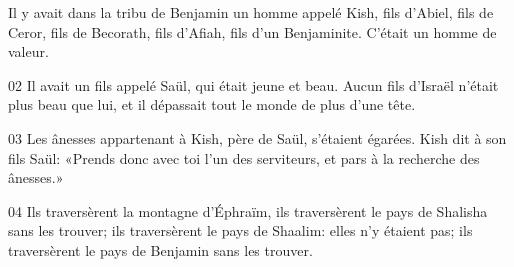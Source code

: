 Il y avait dans la tribu de Benjamin un homme appelé Kish, fils d’Abiel, fils de Ceror, fils de Becorath, fils d’Afiah, fils d’un Benjaminite. C’était un homme de valeur.

02 Il avait un fils appelé Saül, qui était jeune et beau. Aucun fils d’Israël n’était plus beau que lui, et il dépassait tout le monde de plus d’une tête.

03 Les ânesses appartenant à Kish, père de Saül, s’étaient égarées. Kish dit à son fils Saül: «Prends donc avec toi l’un des serviteurs, et pars à la recherche des ânesses.»

04 Ils traversèrent la montagne d’Éphraïm, ils traversèrent le pays de Shalisha sans les trouver; ils traversèrent le pays de Shaalim: elles n’y étaient pas; ils traversèrent le pays de Benjamin sans les trouver.
